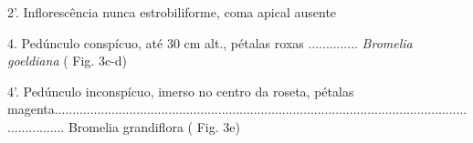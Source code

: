 \begin{customList1}
\begin{customList1}
\begin{customList1}
\end{customList1}

\item \par{}2'.\allowbreak{} Inflorescência nunca estrobiliforme,\allowbreak{} coma apical ausente
\begin{customList1}
\item \par{}4.\allowbreak{} Pedúnculo conspícuo,\allowbreak{} até 30 cm alt.\allowbreak{},\allowbreak{} pétalas roxas .\allowbreak{}.\allowbreak{}.\allowbreak{}.\allowbreak{}.\allowbreak{}.\allowbreak{}.\allowbreak{}.\allowbreak{}.\allowbreak{}.\allowbreak{}.\allowbreak{}.\allowbreak{}.\allowbreak{}.\allowbreak{} \textit{Bromelia goeldiana } (\allowbreak{} Fig.\allowbreak{} 3c-\allowbreak{}d)\allowbreak{}
\item \par{}4'.\allowbreak{} Pedúnculo inconspícuo,\allowbreak{} imerso no centro da roseta,\allowbreak{} pétalas magenta.\allowbreak{}.\allowbreak{}.\allowbreak{}.\allowbreak{}.\allowbreak{}.\allowbreak{}.\allowbreak{}.\allowbreak{}.\allowbreak{}.\allowbreak{}.\allowbreak{}.\allowbreak{}.\allowbreak{}.\allowbreak{}.\allowbreak{}.\allowbreak{}.\allowbreak{}.\allowbreak{}.\allowbreak{}.\allowbreak{}.\allowbreak{}.\allowbreak{}.\allowbreak{}.\allowbreak{}.\allowbreak{}.\allowbreak{}.\allowbreak{}.\allowbreak{}.\allowbreak{}.\allowbreak{}.\allowbreak{}.\allowbreak{}.\allowbreak{}.\allowbreak{}.\allowbreak{}.\allowbreak{}.\allowbreak{}.\allowbreak{}.\allowbreak{}.\allowbreak{}.\allowbreak{}.\allowbreak{}.\allowbreak{}.\allowbreak{}.\allowbreak{}.\allowbreak{}.\allowbreak{}.\allowbreak{}.\allowbreak{}.\allowbreak{}.\allowbreak{}.\allowbreak{}.\allowbreak{}.\allowbreak{}.\allowbreak{}.\allowbreak{}.\allowbreak{}.\allowbreak{}.\allowbreak{}.\allowbreak{}.\allowbreak{}.\allowbreak{}.\allowbreak{}.\allowbreak{}.\allowbreak{}.\allowbreak{}.\allowbreak{}.\allowbreak{}.\allowbreak{}.\allowbreak{}.\allowbreak{}.\allowbreak{}.\allowbreak{}.\allowbreak{}.\allowbreak{}.\allowbreak{}.\allowbreak{}.\allowbreak{}.\allowbreak{}.\allowbreak{}.\allowbreak{}.\allowbreak{}.\allowbreak{}.\allowbreak{}.\allowbreak{}.\allowbreak{}.\allowbreak{}.\allowbreak{}.\allowbreak{}.\allowbreak{}.\allowbreak{}.\allowbreak{}.\allowbreak{}.\allowbreak{}.\allowbreak{}.\allowbreak{}.\allowbreak{}.\allowbreak{}.\allowbreak{}.\allowbreak{}.\allowbreak{}.\allowbreak{}.\allowbreak{}.\allowbreak{}.\allowbreak{}.\allowbreak{}.\allowbreak{}.\allowbreak{}.\allowbreak{}.\allowbreak{}.\allowbreak{}.\allowbreak{}.\allowbreak{}.\allowbreak{}.\allowbreak{}.\allowbreak{}.\allowbreak{}.\allowbreak{}.\allowbreak{}.\allowbreak{}.\allowbreak{}.\allowbreak{}.\allowbreak{}.\allowbreak{}.\allowbreak{}.\allowbreak{}.\allowbreak{}.\allowbreak{}.\allowbreak{}.\allowbreak{}.\allowbreak{}.\allowbreak{} Bromelia grandiflora (\allowbreak{} Fig.\allowbreak{} 3e)\allowbreak{}
\end{customList1}


\end{customList1}
\end{customList1}

